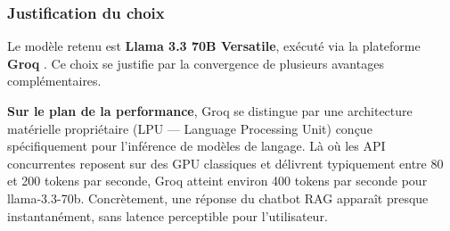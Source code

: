 \begin{table}[H]
\centering
\renewcommand{\arraystretch}{1.4}
\caption{Comparaison des modèles de langage évalués}
\label{tab:model_comparison}
\end{table}

\subsubsection*{Justification du choix}

Le modèle retenu est \textbf{Llama 3.3 70B Versatile}, exécuté via la plateforme
\textbf{Groq} \cite{groq}. Ce choix se justifie par la convergence de plusieurs avantages
complémentaires.

\textbf{Sur le plan de la performance}, Groq se distingue par une architecture
matérielle propriétaire (LPU — Language Processing Unit) conçue spécifiquement
pour l'inférence de modèles de langage. Là où les API concurrentes reposent sur
des GPU classiques et délivrent typiquement entre 80 et 200 tokens par seconde,
Groq atteint environ 400 tokens par seconde pour llama-3.3-70b. Concrètement,
une réponse du chatbot RAG apparaît presque instantanément, sans latence
perceptible pour l'utilisateur.

